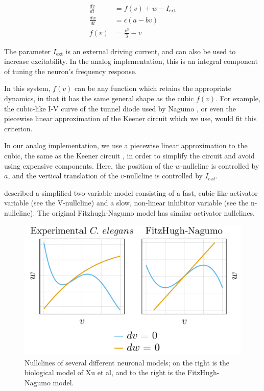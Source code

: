 \documentclass[
    11pt,
]{article}
\begin{document}
\begin{equation}
    \label{eq: fhn}
    \begin{aligned}
        \frac{dv}{dt} &= f(v) + w - I_\mathrm{ext}\\
        \frac{dw}{dt} &= \epsilon (a - bv)\\
        f(v) &= \frac{v^3}{3} - v
    \end{aligned}
\end{equation}

The parameter $I_\mathrm{ext}$ is an external driving current, and can also be used to increase excitability.  In the analog implementation, this is an integral component of tuning the neuron's frequency response.

In this system, $f(v)$ can be any function which retains the appropriate dynamics, in that it has the same general shape as the cubic $f(v)$.  For example, the cubic-like I-V curve of the tunnel diode used by Nagumo \cite{nagumo1962}, or even the piecewise linear approximation of the Keener circuit \cite{keener1983} which we use, would fit this criterion.

In our analog implementation, we use a piecewise linear approximation to the cubic, the same as the Keener circuit \cite{keener1983}, in order to simplify the circuit and avoid using expensive components.  Here, the position of the $w$-nullcline is controlled by $a$, and the vertical translation of the $v$-nullcline is controlled by $I_{ext}$.

\citet{xu2018} described a simplified two-variable model consisting of a fast, cubic-like activator variable (see the V-nullcline) and a slow, non-linear inhibitor variable (see the n-nullcline). The original Fitzhugh-Nagumo model has similar activator nullclines.

\begin{figure}[h!]
    \label{fig: nm nullclines}
    \centering
    \includegraphics{figures/neuron_dynamics/neuron_dynamics.pdf}
    \caption{Nullclines of several different neuronal models; on the right is the biological model of Xu et al, and to the right is the FitzHugh-Nagumo model.}
\end{figure}
\end{document}
